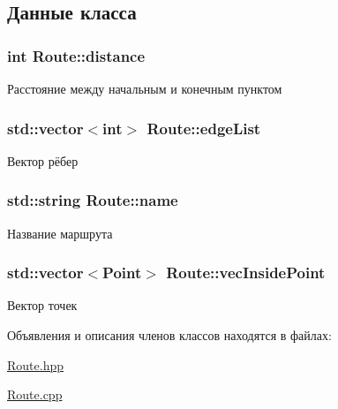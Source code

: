 \subsection{Данные класса}
\subsubsection[{\texorpdfstring{distance}{distance}}]{\setlength{\rightskip}{0pt plus 5cm}int Route\+::distance\hspace{0.3cm}{\ttfamily [private]}}\hypertarget{class_route_a29e1ec576b2d6a5b4281b414f11e6bc6}{}\label{class_route_a29e1ec576b2d6a5b4281b414f11e6bc6}


Расстояние между начальным и конечным пунктом 

\subsubsection[{\texorpdfstring{edge\+List}{edgeList}}]{\setlength{\rightskip}{0pt plus 5cm}std\+::vector$<$int$>$ Route\+::edge\+List\hspace{0.3cm}{\ttfamily [private]}}\hypertarget{class_route_a9eb67e4bd0e29d2a53fa20aba73beaa8}{}\label{class_route_a9eb67e4bd0e29d2a53fa20aba73beaa8}


Вектор рёбер 

\subsubsection[{\texorpdfstring{name}{name}}]{\setlength{\rightskip}{0pt plus 5cm}std\+::string Route\+::name\hspace{0.3cm}{\ttfamily [private]}}\hypertarget{class_route_a892cceaead1c1602577ddfa5f9b1df32}{}\label{class_route_a892cceaead1c1602577ddfa5f9b1df32}


Название маршрута 

\subsubsection[{\texorpdfstring{vec\+Inside\+Point}{vecInsidePoint}}]{\setlength{\rightskip}{0pt plus 5cm}std\+::vector$<${\bf Point}$>$ Route\+::vec\+Inside\+Point\hspace{0.3cm}{\ttfamily [private]}}\hypertarget{class_route_a5b26e655044d222f569daf4639c8ff48}{}\label{class_route_a5b26e655044d222f569daf4639c8ff48}


Вектор точек 



Объявления и описания членов классов находятся в файлах\+:\begin{DoxyCompactItemize}
\item 
\hyperlink{_route_8hpp}{Route.\+hpp}\item 
\hyperlink{_route_8cpp}{Route.\+cpp}\end{DoxyCompactItemize}
